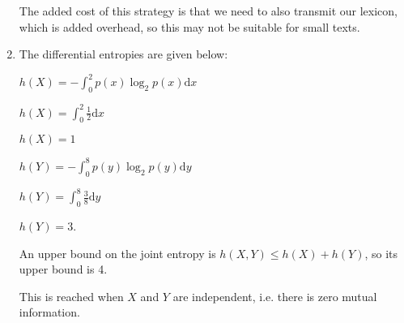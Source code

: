 \begin{enumerate}[label=(\alph*)]
    The added cost of this strategy is that we need to also transmit our lexicon, which is added overhead, so this may not be suitable for small texts.

  \item


    The differential entropies are given below:

    $h(X) = -\int_0^2 p(x)\log_2 p(x) \mathrm{d}x$

    $h(X) = \int_0^2 \frac{1}{2} \mathrm{d}x$

    $h(X) = 1$

    $h(Y) = -\int_0^8 p(y)\log_2p(y) \mathrm{d}y$

    $h(Y) = \int_0^8 \frac{3}{8} \mathrm{d}y$

    $h(Y) = 3$.

    An upper bound on the joint entropy is $h(X,Y) \leq h(X) + h(Y)$, so its upper bound is 4.

    This is reached when $X$ and $Y$ are independent, i.e. there is zero mutual information.



        
    \end{enumerate}

